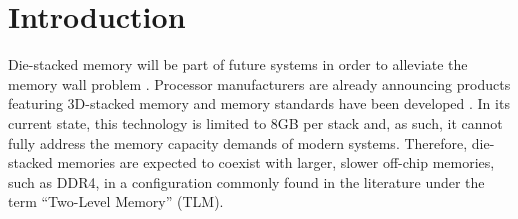 \section{Introduction}
\label{sec:Introduction}



Die-stacked memory will be part of future systems in order to alleviate the memory wall problem \cite{wulf-can95}. Processor manufacturers are already announcing products featuring 3D-stacked memory \cite{KnightsLanding,NVIDIA,black-micro2013}  and memory standards have been developed \cite{jedec-wideio,JEDEC-HBM,pawlowski-hotchips2011}. In its current state, this technology is limited to 8GB per stack \cite{JEDEC-HBM-REVISED} and, as such, it cannot fully address the memory capacity demands of modern systems. Therefore, die-stacked memories are expected to coexist with larger, slower off-chip memories, such as DDR4, in a configuration commonly found in the literature under the term ``Two-Level Memory'' (TLM).  

